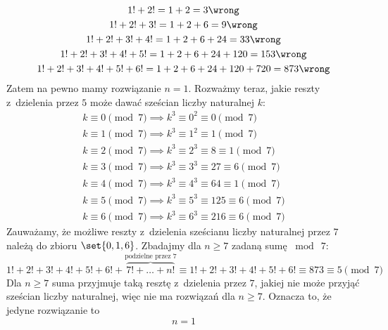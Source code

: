 \begin{enumerate}[label={\alph*)}]
\begin{gather*}
            1! + 2! = 1 + 2 = 3 \wrong\\
            1! + 2! + 3! = 1 + 2 + 6 = 9 \wrong\\
            1! + 2! + 3! + 4! = 1 + 2 + 6 + 24 = 33 \wrong\\
            1! + 2! + 3! + 4! + 5! = 1 + 2 + 6 + 24 + 120 = 153 \wrong\\
            1! + 2! + 3! + 4! + 5! + 6! = 1 + 2 + 6 + 24 + 120 + 720 = 873 \wrong
        \end{gather*}
        Zatem na pewno mamy rozwiązanie \(n = 1\). Rozważmy teraz, jakie reszty z~dzielenia przez \(5\) może dawać sześcian liczby naturalnej \(k\):
        \begin{gather*}
            k \equiv 0 \pmod{7} \implies k^3 \equiv 0^2 \equiv 0 \pmod{7}\\
            k \equiv 1 \pmod{7} \implies k^3 \equiv 1^2 \equiv 1 \pmod{7}\\
            k \equiv 2 \pmod{7} \implies k^3 \equiv 2^3 \equiv 8 \equiv 1 \pmod{7}\\
            k \equiv 3 \pmod{7} \implies k^3 \equiv 3^3 \equiv 27 \equiv 6 \pmod{7}\\
            k \equiv 4 \pmod{7} \implies k^3 \equiv 4^3 \equiv 64 \equiv 1 \pmod{7}\\
            k \equiv 5 \pmod{7} \implies k^3 \equiv 5^3 \equiv 125 \equiv 6 \pmod{7}\\
            k \equiv 6 \pmod{7} \implies k^3 \equiv 6^3 \equiv 216 \equiv 6 \pmod{7}
        \end{gather*}
        Zauważamy, że możliwe reszty z~dzielenia sześcianu liczby naturalnej przez \(7\) należą do zbioru \(\set{0, 1, 6}\). Zbadajmy dla \(n \geq 7\) zadaną sumę \(\bmod\ 7\):
        \begin{equation*}
            1! + 2! + 3! + 4! + 5! + 6! + \overbrace{7! + \ldots + n!}^{\text{podzielne przez } 7} \equiv 1! + 2! + 3! + 4! + 5! + 6! \equiv 873 \equiv 5 \pmod{7}
        \end{equation*}
        Dla \(n \geq 7\) suma przyjmuje taką resztę z~dzielenia przez \(7\), jakiej nie może przyjąć sześcian liczby naturalnej, więc nie ma rozwiązań dla \(n \geq 7\). Oznacza to, że jedyne rozwiązanie to
        \begin{equation*}
            n = 1
        \end{equation*}
\end{enumerate}

